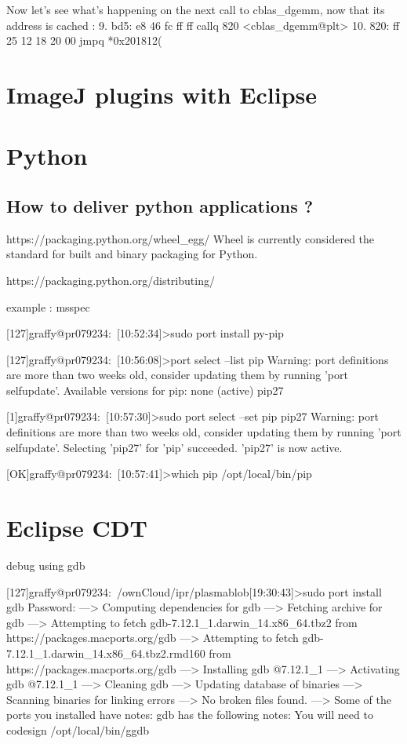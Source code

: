 \documentclass[a4paper]{report}
\begin{document}
		Now let's see what's happening on the next call to cblas_dgemm, now that its address is cached :
			9.  bd5:   e8 46 fc ff ff          callq  820 <cblas_dgemm@plt>
			10. 820:   ff 25 12 18 20 00       jmpq   *0x201812(%
	

	\section{ImageJ plugins with Eclipse}

	\section{Python}
	
		\subsection{How to deliver python applications ?}



			https://packaging.python.org/wheel_egg/
				Wheel is currently considered the standard for built and binary packaging for Python.

			https://packaging.python.org/distributing/


			example : msspec
			
			[127]graffy@pr079234:~[10:52:34]>sudo port install py-pip
	
			[127]graffy@pr079234:~[10:56:08]>port select --list pip
			Warning: port definitions are more than two weeks old, consider updating them by running 'port selfupdate'.
			Available versions for pip:
				none (active)
				pip27

			[1]graffy@pr079234:~[10:57:30]>sudo port select  --set pip pip27
			Warning: port definitions are more than two weeks old, consider updating them by running 'port selfupdate'.
			Selecting 'pip27' for 'pip' succeeded. 'pip27' is now active.
				
			[OK]graffy@pr079234:~[10:57:41]>which pip
/opt/local/bin/pip


	\section{Eclipse CDT}
	
		debug using gdb

		[127]graffy@pr079234:~/ownCloud/ipr/plasmablob[19:30:43]>sudo port install gdb
		Password:
		--->  Computing dependencies for gdb
		--->  Fetching archive for gdb
		--->  Attempting to fetch gdb-7.12.1_1.darwin_14.x86_64.tbz2 from https://packages.macports.org/gdb
		--->  Attempting to fetch gdb-7.12.1_1.darwin_14.x86_64.tbz2.rmd160 from https://packages.macports.org/gdb
		--->  Installing gdb @7.12.1_1
		--->  Activating gdb @7.12.1_1
		--->  Cleaning gdb
		--->  Updating database of binaries
		--->  Scanning binaries for linking errors
		--->  No broken files found.                             
		--->  Some of the ports you installed have notes:
		  gdb has the following notes:
			You will need to codesign /opt/local/bin/ggdb
	
\end{document}
